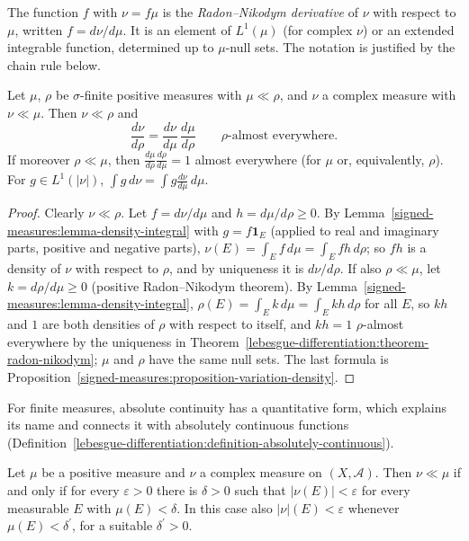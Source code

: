 \begin{notation}\label{signed-measures:notation-radon-nikodym}
The function $f$ with $\nu = f\mu$ is the \emph{Radon--Nikodym derivative} of $\nu$ with respect to $\mu$, written $f = d\nu/d\mu$. It is an element of $L^1(\mu)$ (for complex $\nu$) or an extended
integrable function, determined up to $\mu$-null sets. The notation is justified by the chain rule below.
\end{notation}

\begin{proposition}\label{signed-measures:proposition-chain-rule}
Let $\mu$, $\rho$ be $\sigma$-finite positive measures with $\mu \ll \rho$, and $\nu$ a complex measure with $\nu \ll \mu$. Then $\nu \ll \rho$ and
\[
\frac{d\nu}{d\rho} = \frac{d\nu}{d\mu}\,\frac{d\mu}{d\rho} \qquad \rho\text{-almost everywhere}.
\]
If moreover $\rho \ll \mu$, then $\frac{d\mu}{d\rho}\frac{d\rho}{d\mu} = 1$ almost everywhere (for $\mu$ or, equivalently, $\rho$). For $g \in L^1(|\nu|)$, $\int g\,d\nu = \int g\frac{d\nu}{d\mu}\,d\mu$.
\end{proposition}

\begin{proof}
Clearly $\nu \ll \rho$. Let $f = d\nu/d\mu$ and $h = d\mu/d\rho \geq 0$. By Lemma~\ref{signed-measures:lemma-density-integral} with $g = f\mathbf{1}_E$ (applied to real and imaginary parts, positive and
negative parts), $\nu(E) = \int_Ef\,d\mu = \int_Efh\,d\rho$; so $fh$ is a density of $\nu$ with respect to $\rho$, and by uniqueness it is $d\nu/d\rho$. If also $\rho \ll \mu$, let $k = d\rho/d\mu \geq 0$ (positive
Radon--Nikodym theorem). By Lemma~\ref{signed-measures:lemma-density-integral}, $\rho(E) = \int_Ek\,d\mu = \int_Ekh\,d\rho$ for all $E$, so $kh$ and $1$ are both densities of $\rho$ with respect to
itself, and $kh = 1$ $\rho$-almost everywhere by the uniqueness in Theorem~\ref{lebesgue-differentiation:theorem-radon-nikodym}; $\mu$ and $\rho$ have the same null sets. The last formula is
Proposition~\ref{signed-measures:proposition-variation-density}.
\end{proof}

For finite measures, absolute continuity has a quantitative form, which explains its name and connects it with absolutely continuous functions
(Definition~\ref{lebesgue-differentiation:definition-absolutely-continuous}).

\begin{theorem}\label{signed-measures:theorem-epsilon-delta}
Let $\mu$ be a positive measure and $\nu$ a complex measure on $(X, \mathcal{A})$. Then $\nu \ll \mu$ if and only if for every $\varepsilon > 0$ there is $\delta > 0$ such that $|\nu(E)| < \varepsilon$
for every measurable $E$ with $\mu(E) < \delta$. In this case also $|\nu|(E) < \varepsilon$ whenever $\mu(E) < \delta^{\prime}$, for a suitable $\delta^{\prime} > 0$.
\end{theorem}

